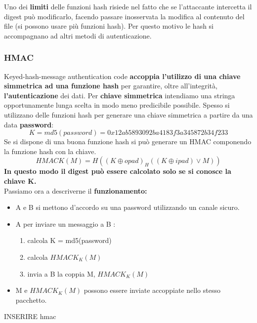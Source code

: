 \documentclass[12pt]{article}
\begin{document}
			Uno dei \textbf{limiti} delle funzioni hash risiede nel fatto che se l'attaccante intercetta il digest può modificarlo, facendo passare inosservata la modifica al contenuto del file (si possono usare più funzioni hash). Per questo motivo le hash si accompagnano ad altri metodi di autenticazione.
			\subsubsection{HMAC}
				Keyed-hash-message authentication code \textbf{accoppia l'utilizzo di una chiave simmetrica ad una funzione hash} per garantire, oltre all'integrità, \textbf{l'autenticazione} dei dati. Per \textbf{chiave simmetrica} intendiamo una stringa opportunamente lunga scelta in modo meno predicibile possibile. Spesso si utilizzano delle funzioni hash per generare una chiave simmetrica a partire da una data \textbf{password}:
				$$ K = md5(password) = 0x12ab5893092ba4183f3a345872b34f233$$
				Se si dispone di una buona funzione hash si può generare un HMAC componendo la funzione hash con la chiave.
				$$HMACK (M) = H((K \oplus opad) _ H((K \oplus ipad) \vee M)) $$
				\textbf{In questo modo il digest può essere calcolato solo se si conosce la chiave K.}\\
				Passiamo ora a descriverne il \textbf{funzionamento:}
				\begin{itemize}
					\item A e B si mettono d'accordo su una password utilizzando un canale sicuro.
					\item A per inviare un messaggio a B :
					\begin{enumerate}
						\item calcola K = md5(password)
						\item calcola $HMACK_{K}(M)$
						\item invia a B la coppia M, $HMACK_{K}(M)$
					\end{enumerate}
					\item M e $HMACK_{K}(M)$ possono essere inviate accoppiate nello stesso pacchetto.
				\end{itemize} 
			
				INSERIRE hmac\\
				
\end{document}
